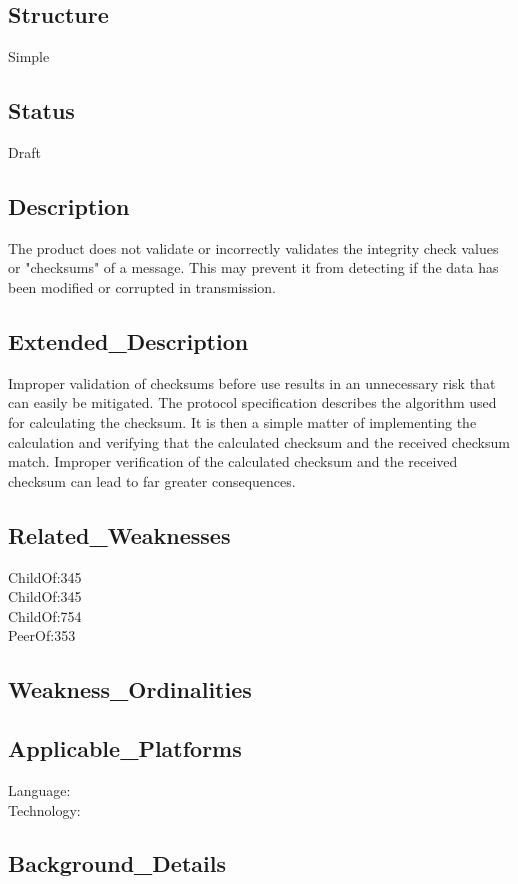 \subsection*{Structure}
Simple

\subsection*{Status}
Draft

\subsection*{Description}
The product does not validate or incorrectly validates the integrity check values or "checksums" of a message. This may prevent it from detecting if the data has been modified or corrupted in transmission.

\subsection*{Extended\_Description}
Improper validation of checksums before use results in an unnecessary risk that can easily be mitigated. The protocol specification describes the algorithm used for calculating the checksum. It is then a simple matter of implementing the calculation and verifying that the calculated checksum and the received checksum match. Improper verification of the calculated checksum and the received checksum can lead to far greater consequences.

\subsection*{Related\_Weaknesses}
ChildOf:345\\
ChildOf:345\\
ChildOf:754\\
PeerOf:353\\
\subsection*{Weakness\_Ordinalities}
\subsection*{Applicable\_Platforms}
Language: \\
Technology: \\
\subsection*{Background\_Details}

